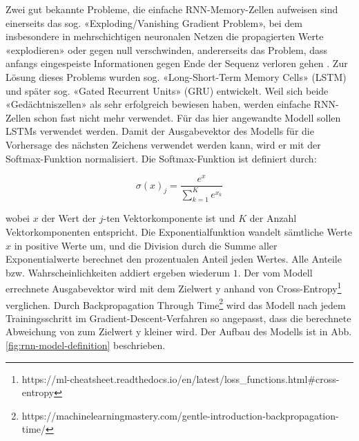 Zwei gut bekannte Probleme, die einfache RNN-Memory-Zellen aufweisen sind einerseits das sog. «Exploding/Vanishing Gradient Problem», bei dem insbesondere in mehrschichtigen neuronalen Netzen
die propagierten Werte «explodieren» oder gegen null verschwinden, andererseits das Problem, dass anfangs eingespeiste Informationen gegen Ende der Sequenz verloren gehen \autocite{geron}.
Zur Lösung dieses Problems wurden sog. «Long-Short-Term Memory Cells» (LSTM)\autocite{lstm} und später sog. «Gated Recurrent Units» (GRU)\autocite{gru} entwickelt.
Weil sich beide «Gedächtniszellen» als sehr erfolgreich bewiesen haben, werden einfache RNN-Zellen schon fast nicht mehr verwendet.
Für das hier angewandte Modell sollen LSTMs verwendet werden.
Damit der Ausgabevektor des Modells für die Vorhersage des nächsten Zeichens verwendet werden kann, wird er mit der Softmax-Funktion normalisiert.
Die Softmax-Funktion ist definiert durch:

\[ \sigma(x)_{j} = \frac{e^{x}}{\sum_{k=1}^{K} e^{x_{k}}} \]

wobei $ x $ der Wert der $ j $-ten Vektorkomponente ist und $ K $ der Anzahl Vektorkomponenten entspricht.
Die Exponentialfunktion wandelt sämtliche Werte $ x $ in positive Werte um, und die Division durch die Summe aller Exponentialwerte berechnet den prozentualen Anteil jeden Wertes.
Alle Anteile bzw. Wahrscheinlichkeiten addiert ergeben wiederum $ 1 $.
Der vom Modell errechnete Ausgabevektor  wird mit dem Zielwert y anhand von Cross-Entropy\footnote{https://ml-cheatsheet.readthedocs.io/en/latest/loss_functions.html#cross-entropy} verglichen.
Durch Backpropagation Through Time\footnote{https://machinelearningmastery.com/gentle-introduction-backpropagation-time/} wird das Modell nach jedem Trainingsschritt im Gradient-Descent-Verfahren
so angepasst, dass die berechnete Abweichung von  zum Zielwert y kleiner wird.
Der Aufbau des Modells ist in Abb. \ref{fig:rnn-model-definition} beschrieben.

